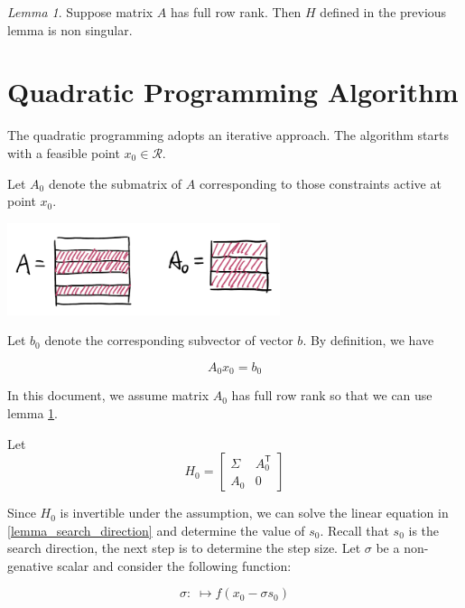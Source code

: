 \documentclass[letterpaper, oneside]{book}
\theoremstyle{definition}
\theoremstyle{remark}
\newtheorem{lemma}[theorem]{Lemma}
\begin{document}
\begin{lemma}\label{lemma_full_row_rank}
	Suppose matrix $A$ has full row rank. Then $H$ defined in the previous lemma is non singular.
\end{lemma}

\section{Quadratic Programming Algorithm}
The quadratic programming adopts an iterative approach. The algorithm starts with a feasible point $x_0 \in \mathcal{R}$.

Let $A_0$ denote the submatrix of $A$ corresponding to those constraints active at point $x_0$.

\begin{center}
\includegraphics[width=0.6\textwidth]{matrix_a_and_a0_small.png}
\end{center}

Let $b_0$ denote the corresponding subvector of vector $b$. By definition, we have

\begin{displaymath}
	A_0 x_0 = b_0
\end{displaymath}

In this document, we assume matrix $A_0$ has full row rank so that we can use lemma \ref{lemma_full_row_rank}. 

Let 
\begin{displaymath}
	H_0 = 
	\begin{bmatrix}
		\Sigma{} & A_0^{\mathsf{T}} \\
		A_0 & 0
	\end{bmatrix}	
\end{displaymath}

Since $H_0$ is invertible under the assumption, we can solve the linear equation in \ref{lemma_search_direction} and determine the value of $s_0$. Recall that $s_0$ is the search direction, the next step is to determine the step size. Let $\sigma$ be a non-genative scalar and consider the following function:

\begin{displaymath}
	\sigma: \; \mapsto f(x_0 - \sigma s_0)
\end{displaymath}
\end{document}
